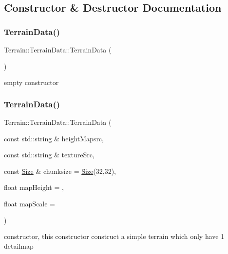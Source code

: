 \subsection{Constructor \& Destructor Documentation}
\mbox{\label{structTerrain_1_1TerrainData_aea03e8a06e607b652c467e4fd475e0de}} 
\subsubsection{\texorpdfstring{Terrain\+Data()}{TerrainData()}\hspace{0.1cm}{\footnotesize\ttfamily [1/8]}}
{\footnotesize\ttfamily Terrain\+::\+Terrain\+Data\+::\+Terrain\+Data (\begin{DoxyParamCaption}{ }\end{DoxyParamCaption})}

empty constructor \mbox{\label{structTerrain_1_1TerrainData_a75bf963bf55942f9fcced98ac047d318}} 
\subsubsection{\texorpdfstring{Terrain\+Data()}{TerrainData()}\hspace{0.1cm}{\footnotesize\ttfamily [2/8]}}
{\footnotesize\ttfamily Terrain\+::\+Terrain\+Data\+::\+Terrain\+Data (\begin{DoxyParamCaption}\item[{const std\+::string \&}]{height\+Mapsrc,  }\item[{const std\+::string \&}]{texture\+Src,  }\item[{const \hyperlink{classSize}{Size} \&}]{chunksize = {\ttfamily \hyperlink{classSize}{Size}(32,32)},  }\item[{float}]{map\+Height = {},  }\item[{float}]{map\+Scale = {} }\end{DoxyParamCaption})}

constructor, this constructor construct a simple terrain which only have 1 detailmap \mbox{\label{structTerrain_1_1TerrainData_a1e4a1574d2ff07e15b3118c3b2396199}} 

